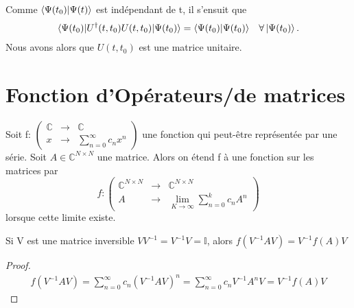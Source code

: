 \documentclass[../notesdecours.tex]{subfiles}
\begin{document}
\begin{Property} Comme $\braket{\Psi(t_0)|\Psi(t)}$ est indépendant de t, il s'ensuit que 
\begin{align}
\braket{\Psi(t_0)|U^\dag (t,t_0)U(t,t_0)|\Psi(t_0)} &= \braket{\Psi(t_0)|\Psi(t_0)}		&\forall\ket{\Psi(t_0)}.
\end{align}
Nous avons alors que $U(t,t_0)$ est une matrice unitaire. \end{Property}

\section{Fonction d'Opérateurs/de matrices}
Soit f: $\begin{pmatrix}
\mathbb{C} & \rightarrow & \mathbb{C}\\
x & \rightarrow & \sum_{n = 0}^{\infty} c_nx^n
\end{pmatrix}$ une fonction qui peut-être représentée par une série. Soit $A\in\mathbb{C}^{N\times N}$ une matrice. Alors on étend f à une fonction sur les matrices par
\begin{equation}
f: \begin{pmatrix}
\mathbb{C}^{N\times N} & \rightarrow & \mathbb{C}^{N\times N}\\
A & \rightarrow & \lim_{K\to\infty} \sum_{n = 0}^{k} c_n A^n
\end{pmatrix}
\end{equation}
lorsque cette limite existe.

\begin{Property} Si V est une matrice inversible $VV^{-1} = V^{-1}V = \mathbb{I}$, alors $f(V^{-1}AV) = V^{-1}f(A)V$ \end{Property}
\begin{proof}
\begin{align*}
f(V^{-1}AV) = \sum_{n = 0}^{\infty} c_n (V^{-1}AV)^n = \sum_{n = 0}^{\infty} c_n V^{-1} A^n V = V^{-1}f(A)V
\end{align*}
\end{proof}
\end{document}

